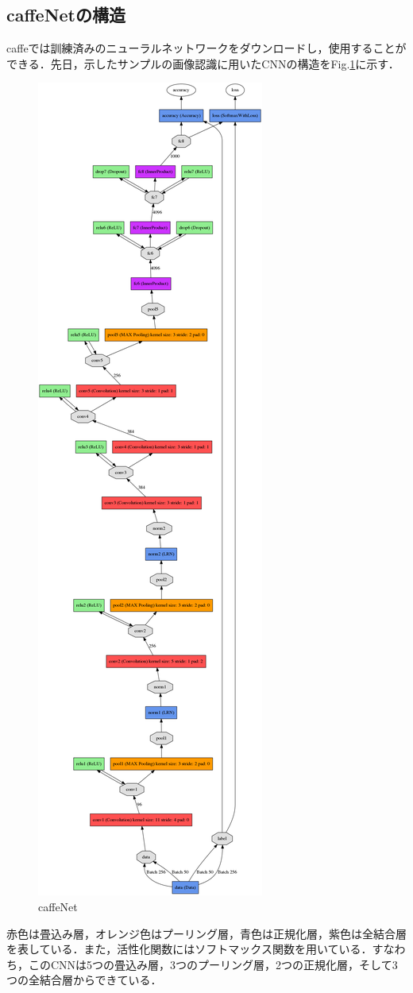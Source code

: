 \documentclass[a4paper,10pt]{jsarticle}
\begin{document}
\subsection{caffeNetの構造}
caffeでは訓練済みのニューラルネットワークをダウンロードし，使用することができる．先日，示したサンプルの画像認識に用いたCNNの構造をFig.\ref{204941_1Jul15}に示す．
\begin{figure}[t]
 \centering
 \includegraphics[scale=0.2]{fig/png/caffeNet.png}
  \caption{caffeNet}
  \label{204941_1Jul15}
\end{figure}
赤色は畳込み層，オレンジ色はプーリング層，青色は正規化層，紫色は全結合層を表している．また，活性化関数にはソフトマックス関数を用いている．すなわち，このCNNは5つの畳込み層，3つのプーリング層，2つの正規化層，そして3つの全結合層からできている．
\end{document}
